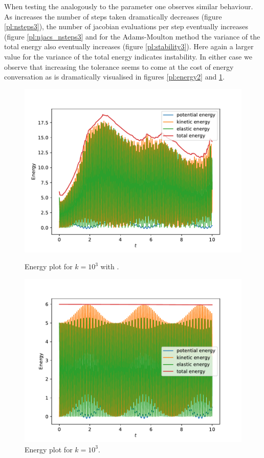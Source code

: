 \documentclass{report}
\begin{document}
When testing the  analogously to the parameter  one observes similar behaviour. As  increases the number of steps taken dramatically decreases (figure \ref{pl:nsteps3}), the number of jacobian evaluations per step eventually increases (figure \ref{pl:njacs_nsteps3} and for the Adams-Moulton method the variance of the total energy also eventually increases (figure \ref{pl:stability3}). Here again a larger value for the variance of the total energy indicates instability.
In either case we observe that increasing the tolerance seems to come at the cost of energy conversation as is dramatically visualised in figures \ref{pl:energy2} and \ref{pl:energy3}.



\begin{figure}[h]
\centering
\begin{minipage}[t]{0.45\textwidth}
\centering
\includegraphics[width=\textwidth]{../Plots/Task4/Figure_450}
\caption{Energy plot for $k=10^3$ with .}
\label{pl:energy2}
\end{minipage}
\hfill
\begin{minipage}[t]{0.45\textwidth}
\centering
\includegraphics[width=\textwidth]{../Plots/Task4/Figure_451}
\caption{Energy plot for $k=10^3$.}
\label{pl:energy3}
\end{minipage}
\end{figure}
\end{document}
